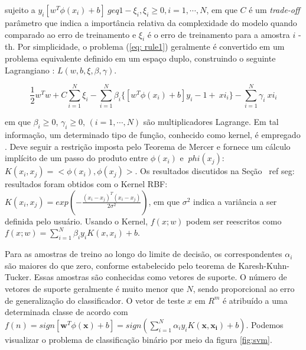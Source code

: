 \noindent sujeito a $ y_i [w ^ T \phi (x_i) + b]\ geq 1 - \xi_i, \xi_i \geq 0, i = 1, \cdots, N $, em que $ C $ é um \textit{trade-off} parâmetro que indica a importância relativa da complexidade do modelo quando comparado ao erro de treinamento e $ \xi_i $ é o erro de treinamento para a amostra $ i $ -th.
Por simplicidade, o problema (\ref{eq: rule1}) geralmente é convertido em um problema equivalente definido em um espaço duplo, construindo o seguinte Lagrangiano \cite{Vapnik}: $ L (w, b, \xi, \beta, \gamma) $.

\begin{equation}
\frac {1} {2} w ^ Tw + C \sum_ {i = 1} ^ N \xi_i- \sum_ {i = 1} ^ N \beta_i \{[w ^T \phi (x_i) + b] y_i-1 + \ xi_i \} - \sum_{i = 1} ^ N \gamma_i \ xi_i
\end{equation}

\noindent em que $ \beta_i \geq 0 $, $ \gamma_i \geq 0 $, $ (i = 1, \cdots, N) $ são multiplicadores Lagrange. Em tal informação, um determinado tipo de função, conhecido como kernel, é empregado \cite{Scholkopf}. Deve seguir a restrição imposta pelo Teorema de Mercer e fornece um cálculo implícito de um passo do produto entre $ \phi (x_i) $ e $ \ phi (x_j) $: $ K (x_i, x_j) = <\phi (x_i), \phi (x_j)> $. Os resultados discutidos na Seção \ ref {seg: resultados} foram obtidos com o Kernel RBF: $ K (x_i, x_j) = exp \left (- \frac {(x_i-x_j) ^ T (x_i-x_j)} {2 \sigma ^ 2} \right) $, em que $ \sigma ^ 2 $ indica a variância a ser definida pelo usuário. Usando o Kernel, $f(x; w) $ podem ser reescritos como
$ f (x; w) = \sum_{i = 1} ^ N \beta_iy_iK(x, x_i) + b $.

Para as amostras de treino ao longo do limite de decisão, os correspondentes $ \alpha_i $ são maiores do que zero, conforme estabelecido pelo teorema de Karesh-Kuhn-Tucker. Essas amostras são conhecidas como vetores de suporte. O número de vetores de suporte geralmente é muito menor que $ N $, sendo proporcional ao erro de generalização do classificador. O vetor de teste $ {x}$ em $ {R} ^ m $ é atribuído a uma determinada classe de acordo com $ f(n) = sign [\mathbf {w} ^ T \phi (\mathbf {x}) + b] = sign(\sum_ {i = 1} ^ {N} \alpha_iy_iK (\mathbf {x}, \mathbf {x_i}) + b) $.  Podemos visualizar o problema de classificação binário por meio da figura \ref{fig:svm}.

